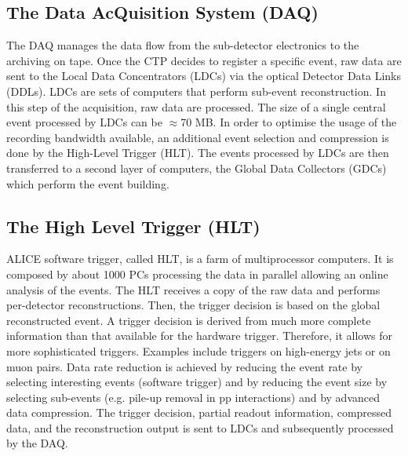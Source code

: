 \subsection{The Data AcQuisition System (DAQ)}
\label{sec:DAQ}
The DAQ manages the data flow from the sub-detector electronics to the archiving
 on tape. Once the CTP decides to register a specific event, raw data are sent to 
 the Local Data Concentrators (LDCs) via the optical Detector Data Links (DDLs). 
 LDCs are sets of computers that perform sub-event reconstruction. In this step of 
 the acquisition, raw data are processed. The size of a single central event processed 
 by LDCs can be $\approx$70 MB. In order to optimise the usage of the recording bandwidth available, 
 an additional event selection and compression is done by the High-Level Trigger (HLT).
The events processed by LDCs are then transferred to a second layer of computers, the Global Data Collectors 
 (GDCs) which perform the event building.
  
 \subsection{The High Level Trigger (HLT)}
\label{sec:HLT}
ALICE software trigger, called HLT, is a farm of multiprocessor computers. 
It is composed by about 1000 PCs processing the data in parallel allowing an 
online analysis of the events. The HLT receives a copy of the raw data 
and performs per-detector reconstructions. Then, the trigger decision is based on 
the global reconstructed event. A trigger decision is derived from much more complete 
information than that available for the hardware trigger. Therefore, it allows for more 
sophisticated triggers. Examples include triggers on high-energy jets or on muon pairs. 
Data rate reduction is achieved by reducing the event rate by selecting interesting events 
(software trigger) and by reducing the event size by selecting sub-events (e.g. pile-up 
removal in pp interactions) and by advanced data compression. 
The trigger decision, partial readout information, compressed data, and the reconstruction output is sent to LDCs and 
subsequently processed by the DAQ. 

